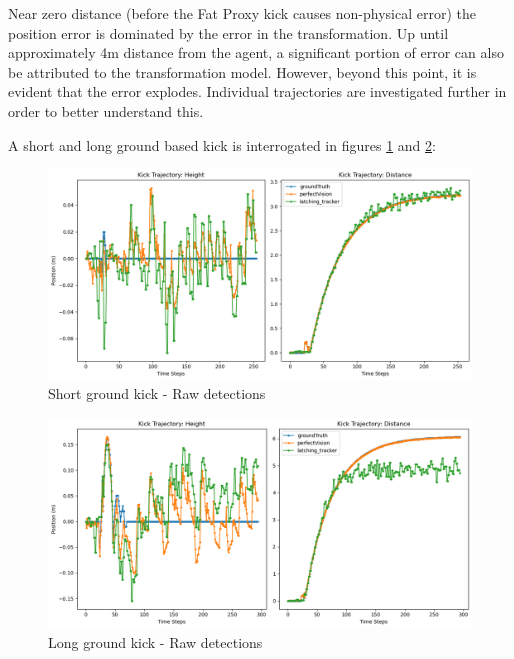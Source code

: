 \documentclass[a4paper,twoside,12pt]{report}
\begin{document}
Near zero distance (before the Fat Proxy kick causes non-physical error) the position error is dominated by the error in the transformation. Up until approximately 4m distance from the agent, a significant portion of error can also be attributed to the transformation model. However, beyond this point, it is evident that the error explodes. Individual trajectories are investigated further in order to better understand this.

A short and long ground based kick is interrogated in figures \ref{fig:rawgroundshort} and \ref{fig:rawgroundlong}:

\begin{figure}[h!]
\begin{center}
\includegraphics[width=12cm]{images/raw_ground_short.png}
\caption{Short ground kick - Raw detections}
\label{fig:rawgroundshort}
\end{center}
\end{figure}

\begin{figure}[h!]
\begin{center}
\includegraphics[width=12cm]{images/raw_ground_long.png}
\caption{Long ground kick - Raw detections}
\label{fig:rawgroundlong}
\end{center}
\end{figure}
\end{document}
